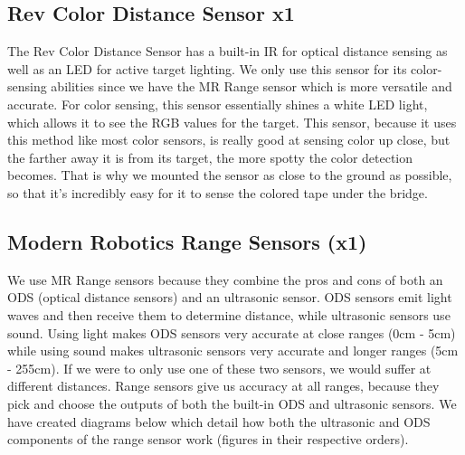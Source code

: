 \documentclass{article}[12pt]
\begin{document}



\subsection[Rev Color Distance Sensor]{Rev Color Distance Sensor x1}
{The Rev Color Distance Sensor has a built-in IR for optical distance sensing as well as an LED for active target lighting. We only use this sensor for its color-sensing abilities since we have the MR Range sensor which is more versatile and accurate. For color sensing, this sensor essentially shines a white LED light, which allows it to see the RGB values for the target. This sensor, because it uses this method like most color sensors, is really good at sensing color up close, but the farther away it is from its target, the more spotty the color detection becomes. That is why we mounted the sensor as close to the ground as possible, so that it’s incredibly easy for it to sense the colored tape under the bridge.} \\




\subsection[Modern Robotics Range Sensors]{Modern Robotics Range Sensors (x1)}
{We use MR Range sensors because they combine the pros and cons of both an ODS (optical distance sensors) and an ultrasonic sensor. ODS sensors emit light waves and then receive them to determine distance, while ultrasonic sensors use sound. Using light makes ODS sensors very accurate at close ranges (0cm - 5cm) while using sound makes ultrasonic sensors very accurate and longer ranges (5cm - 255cm). If we were to only use one of these two sensors, we would suffer at different distances. Range sensors give us accuracy at all ranges, because they pick and choose the outputs of both the built-in ODS and ultrasonic sensors. We have created diagrams below which detail how both the ultrasonic and ODS components of the range sensor work (figures in their respective orders).} \\
\end{document}
